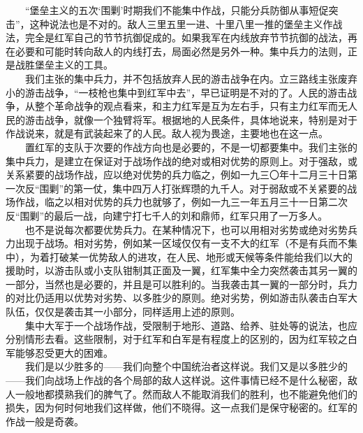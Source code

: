 \documentclass[cn,11pt,chinese]{elegantbook}
\begin{document}
　　“堡垒主义的五次‘围剿’时期我们不能集中作战，只能分兵防御从事短促突击”，这种说法也是不对的。敌人三里五里一进、十里八里一推的堡垒主义作战法，完全是红军自己的节节抗御促成的。如果我军在内线放弃节节抗御的战法，再在必要和可能时转向敌人的内线打去，局面必然是另外一种。集中兵力的法则，正是战胜堡垒主义的工具。\\
　　我们主张的集中兵力，并不包括放弃人民的游击战争在内。立三路线主张废弃小的游击战争，“一枝枪也集中到红军中去”，早已证明是不对的了。人民的游击战争，从整个革命战争的观点看来，和主力红军是互为左右手，只有主力红军而无人民的游击战争，就像一个独臂将军。根据地的人民条件，具体地说来，特别是对于作战说来，就是有武装起来了的人民。敌人视为畏途，主要地也在这一点。\\
　　置红军的支队于次要的作战方向也是必要的，不是一切都要集中。我们主张的集中兵力，是建立在保证对于战场作战的绝对或相对优势的原则上。对于强敌，或关系紧要的战场作战，应以绝对优势的兵力临之，例如一九三〇年十二月三十日第一次反“围剿”的第一仗，集中四万人打张辉瓒的九千人。对于弱敌或不关紧要的战场作战，临之以相对优势的兵力也就够了，例如一九三一年五月三十一日第二次反“围剿”的最后一战，向建宁打七千人的刘和鼎师，红军只用了一万多人。\\
　　也不是说每次都要优势兵力。在某种情况下，也可以用相对劣势或绝对劣势兵力出现于战场。相对劣势，例如某一区域仅仅有一支不大的红军（不是有兵而不集中），为着打破某一优势敌人的进攻，在人民、地形或天候等条件能给我们以大的援助时，以游击队或小支队钳制其正面及一翼，红军集中全力突然袭击其另一翼的一部分，当然也是必要的，并且是可以胜利的。当我袭击其一翼的一部分时，兵力的对比仍适用以优势对劣势、以多胜少的原则。绝对劣势，例如游击队袭击白军大队伍，仅仅是袭击其一小部分，同样适用上述的原则。\\
　　集中大军于一个战场作战，受限制于地形、道路、给养、驻处等的说法，也应分别情形去看。这些限制，对于红军和白军是有程度上的区别的，因为红军较之白军能够忍受更大的困难。\\
　　我们是以少胜多的——我们向整个中国统治者这样说。我们又是以多胜少的——我们向战场上作战的各个局部的敌人这样说。这件事情已经不是什么秘密，敌人一般地都摸熟我们的脾气了。然而敌人不能取消我们的胜利，也不能避免他们的损失，因为何时何地我们这样做，他们不晓得。这一点我们是保守秘密的。红军的作战一般是奇袭。\\
\end{document}
